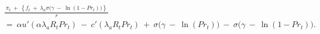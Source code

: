 \begin{equation}
\begin{split}
    & \frac{ \ \dot{\pi}_{t} \ + \ \left\{ f_{t} \ + \ \lambda_{a} \sigma \big( \gamma \ - \ \ln(1 - Pr_{t}) \big) \right\} \ }{r} \\
    & = \ \alpha u'(\alpha \lambda_{a} R_{t} Pr_{t}) \ - \ c'(\lambda_{a} R_{t} Pr_{t}) \ + \ \sigma \big( \gamma \ - \ \ln(Pr_{t}) \big) \ - \ \sigma \big( \gamma \ - \ \ln(1 - Pr_{t}) \big).
\end{split}
\label{Equation:Social-Planners-Problem_Euler-Equation}
\end{equation}